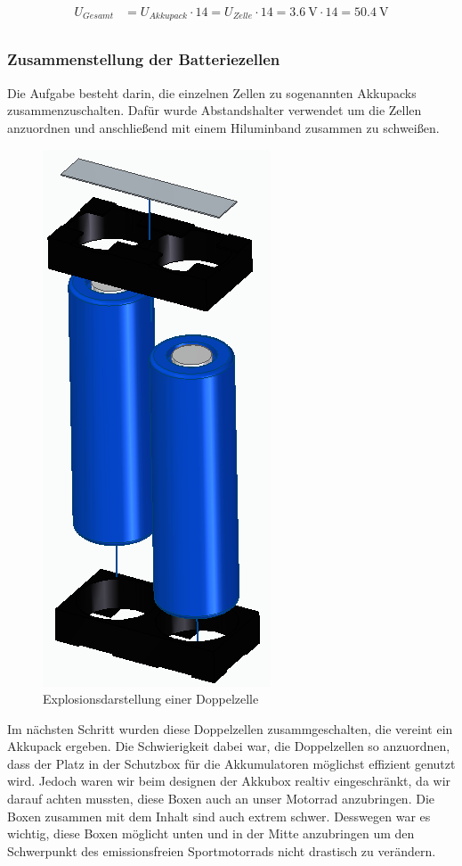 \begin{align*}
U_{Gesamt} &= U_{Akkupack} \cdot 14= U_{Zelle} \cdot 14= 3.6~\mathrm{V} \cdot 14 = 50.4~\mathrm{V}\\
\end{align*}

\subsubsection{Zusammenstellung der Batteriezellen}
Die Aufgabe besteht darin, die einzelnen Zellen zu sogenannten Akkupacks zusammenzuschalten. Dafür wurde Abstandshalter verwendet um die Zellen anzuordnen und anschließend mit einem Hiluminband zusammen zu schweißen. 

\begin{figure}[H]
	\begin{center}
		\includegraphics[scale=0.5]{figures/Akku/Explosionsdarstellung2Zellen.PNG}
		\caption{Explosionsdarstellung einer Doppelzelle}
	\end{center}
\end{figure}

Im nächsten Schritt wurden diese Doppelzellen zusammgeschalten, die vereint ein Akkupack ergeben. Die Schwierigkeit dabei war, die Doppelzellen so anzuordnen, dass der Platz in der Schutzbox für die Akkumulatoren möglichst effizient genutzt wird. Jedoch waren wir beim designen der Akkubox realtiv eingeschränkt, da wir darauf achten mussten, diese Boxen auch an unser Motorrad anzubringen. Die Boxen zusammen mit dem Inhalt sind auch extrem schwer. Desswegen war es wichtig, diese Boxen möglicht unten und in der Mitte anzubringen um den Schwerpunkt des emissionsfreien Sportmotorrads nicht drastisch zu verändern.

